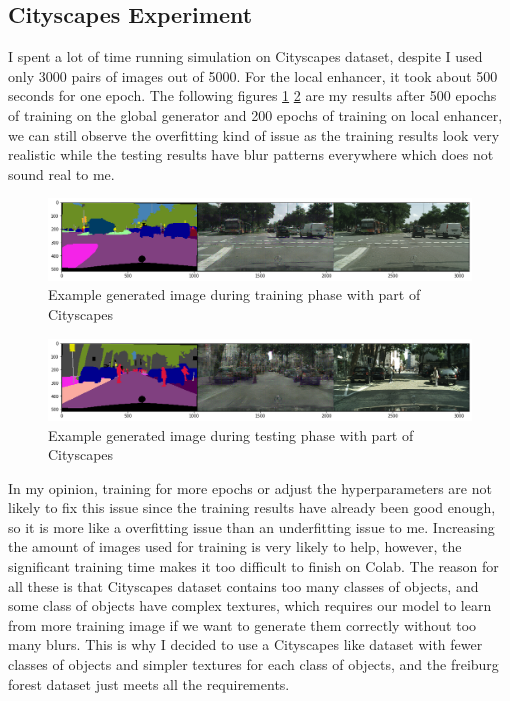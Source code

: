 \subsection{Cityscapes Experiment}
I spent a lot of time running simulation on Cityscapes dataset, despite I used only 3000 
pairs of images out of 5000. For the local enhancer, it took about 500 seconds for one 
epoch. The following figures \ref{fig:Cityscapes-train} \ref{fig:Cityscapes-test} are my 
results after 500 epochs of training on the global generator and 200 epochs of training 
on local enhancer, we can still observe the overfitting kind of issue as the training 
results look very realistic while the testing results have blur patterns everywhere 
which does not sound real to me.
\begin{figure}[H]
    \begin{center}
    \includegraphics[width=14cm]{figures/cityscapes-train}
    \end{center}
    \caption{Example generated image during training phase with part of Cityscapes}
    \label{fig:Cityscapes-train}
\end{figure}

\begin{figure}[H]
    \begin{center}
    \includegraphics[width=14cm]{figures/cityscapes-test}
    \end{center}
    \caption{Example generated image during testing phase with part of Cityscapes}
    \label{fig:Cityscapes-test}
\end{figure}

In my opinion, training for more epochs or adjust the hyperparameters are not likely to fix 
this issue since the training results have already been good enough, so it is more like a 
overfitting issue than an underfitting issue to me. Increasing the amount of images used for 
training is very likely to help, however, the significant training time makes it too 
difficult to finish on Colab. The reason for all these is that Cityscapes dataset contains 
too many classes of objects, and some class of objects have complex textures, which requires 
our model to learn from more training image if we want to generate them correctly without too 
many blurs.
This is why I decided to use a Cityscapes like dataset with 
fewer classes of objects and simpler textures for each class of objects, and the freiburg 
forest dataset just meets all the requirements.
